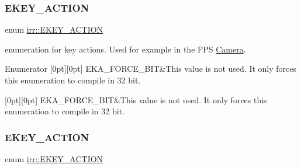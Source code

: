 \subsubsection{\texorpdfstring{E\+K\+E\+Y\+\_\+\+A\+C\+T\+I\+ON}{EKEY\_ACTION}\hspace{0.1cm}{\footnotesize\ttfamily [1/2]}}
{\footnotesize\ttfamily enum \hyperlink{namespaceirr_aa9946ac9f3142f9e790ce52d59fd6168}{irr\+::\+E\+K\+E\+Y\+\_\+\+A\+C\+T\+I\+ON}}



enumeration for key actions. Used for example in the F\+PS \hyperlink{classCamera}{Camera}. 

\begin{DoxyEnumFields}{Enumerator}
[0pt][0pt]{}\mbox{\label{namespaceirr_aa9946ac9f3142f9e790ce52d59fd6168a8329ce2269a20c9da94c54bc9a2d2312}} 
E\+K\+A\+\_\+\+F\+O\+R\+C\+E\+\_\+B\+IT&This value is not used. It only forces this enumeration to compile in 32 bit. \\
\hline

[0pt][0pt]{}\mbox{\label{namespaceirr_aa9946ac9f3142f9e790ce52d59fd6168a8329ce2269a20c9da94c54bc9a2d2312}} 
E\+K\+A\+\_\+\+F\+O\+R\+C\+E\+\_\+B\+IT&This value is not used. It only forces this enumeration to compile in 32 bit. \\
\hline

\end{DoxyEnumFields}
\mbox{\label{namespaceirr_aa9946ac9f3142f9e790ce52d59fd6168}} 
\subsubsection{\texorpdfstring{E\+K\+E\+Y\+\_\+\+A\+C\+T\+I\+ON}{EKEY\_ACTION}\hspace{0.1cm}{\footnotesize\ttfamily [2/2]}}
{\footnotesize\ttfamily enum \hyperlink{namespaceirr_aa9946ac9f3142f9e790ce52d59fd6168}{irr\+::\+E\+K\+E\+Y\+\_\+\+A\+C\+T\+I\+ON}}




